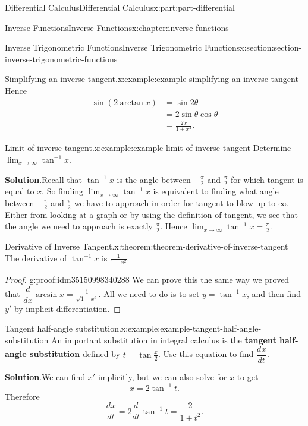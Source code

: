 \documentclass[twoside,10pt,]{book}
\newcommand{\blocktitlefont}{\relax}
\newcommand{\terminology}[1]{\textbf{#1}}
\numberwithin{equation}{part}
\newcommand{\dv}[3][]{\dfrac{d^{#1} #2}{d #3^{#1}}}
\begin{document}
\begin{partptx}{Differential Calculus}{}{Differential Calculus}{}{}{x:part:part-differential}
\begin{chapterptx}{Inverse Functions}{}{Inverse Functions}{}{}{x:chapter:inverse-functions}
\begin{sectionptx}{Inverse Trigonometric Functions}{}{Inverse Trigonometric Functions}{}{}{x:section:section-inverse-trigonometric-functions}
\begin{example}{Simplifying an inverse tangent.}{x:example:example-simplifying-an-inverse-tangent}
Hence%
\begin{align*}
\sin(2\arctan x) & = \sin2\theta \\
& = 2\sin\theta\cos\theta \\
& = \frac{2x}{1+x^{2}}. 
\end{align*}
%
\end{example}
\begin{example}{Limit of inverse tangent.}{x:example:example-limit-of-inverse-tangent}%
Determine \(\lim_{x\to\infty}\tan^{-1}x\).%
\par\smallskip%
\noindent\textbf{\blocktitlefont Solution}.\hypertarget{g:solution:idm35150998346304}{}\quad{}Recall that \(\tan^{-1}x\) is the angle between \(-\frac{\pi}{2}\) and \(\frac{\pi}{2}\) for which tangent is equal to \(x\). So finding \(\lim_{x\to\infty}\tan^{-1}x\) is equivalent to finding what angle between \(-\frac{\pi}{2}\) and \(\frac{\pi}{2}\) we have to approach in order for tangent to blow up to \(\infty\). Either from looking at a graph or by using the definition of tangent, we see that the angle we need to approach is exactly \(\frac{\pi}{2}\). Hence \(\lim_{x\to\infty}\tan^{-1}x = \frac{\pi}{2}\).%
\end{example}
\begin{theorem}{Derivative of Inverse Tangent.}{}{x:theorem:theorem-derivative-of-inverse-tangent}%
The derivative of \(\tan^{-1}x\) is \(\frac{1}{1+x^{2}}\).%
\end{theorem}
\begin{proof}{}{g:proof:idm35150998340288}
We can prove this the same way we proved that \(\dv{}{x}\arcsin x = \frac{1}{\sqrt{1+x^{2}}}\). All we need to do is to set \(y = \tan^{-1}x\), and then find \(y'\) by implicit differentiation.%
\end{proof}
\begin{example}{Tangent half-angle substitution.}{x:example:example-tangent-half-angle-substitution}%
An important substitution in integral calculus is the \terminology{tangent half-angle substitution} defined by \(t = \tan\frac{x}{2}\). Use this equation to find \(\dv{x}{t}\).%
\par\smallskip%
\noindent\textbf{\blocktitlefont Solution}.\hypertarget{g:solution:idm35150998402112}{}\quad{}We can find \(x'\) implicitly, but we can also solve for \(x\) to get%
\begin{equation*}
x = 2\tan^{-1}t.
\end{equation*}
Therefore%
\begin{equation*}
\dv{x}{t} = 2\dv{}{t}\tan^{-1}t = \frac{2}{1+t^{2}}.

\end{equation*}
\end{example}
\end{sectionptx}
\end{chapterptx}
\end{partptx}
\end{document}

